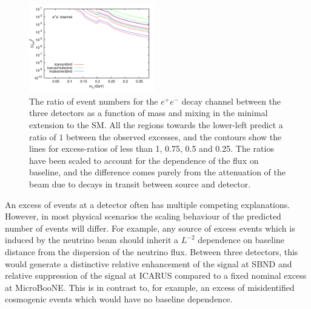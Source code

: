\documentclass[11pt, a4paper]{article}
\def\muboone{MicroBooNE}
\begin{document}
\begin{figure}[t]
%
\centering
%
\includegraphics[width=0.49\textwidth,clip,trim=0 20 35 10]{figures/baselineratios_ee_um4.pdf} 
%
\caption{\label{fig:baselineratios} The ratio of event numbers for the $e^+e^-$
decay channel between the three detectors as a function of mass and mixing in
the minimal extension to the SM.  All the regions towards the lower-left
predict a ratio of $1$ between the observed excesses, and the contours show the
lines for excess-ratios of less than 1, 0.75, 0.5 and 0.25. The ratios have been scaled
to account for the dependence of the flux on baseline, and the difference comes
purely from the attenuation of the beam due to decays in transit between source
and detector. }
%
\end{figure}

An excess of events at a detector often has multiple competing explanations.
However, in most physical scenarios the scaling behaviour of the predicted
number of events will differ. For example, any source of excess events which is
induced by the neutrino beam should inherit a $L^{-2}$ dependence on baseline
distance from the dispersion of the neutrino flux. Between three detectors,
this would generate a distinctive relative enhancement of the signal at SBND
and relative suppression of the signal at ICARUS compared to a fixed nominal
excess at \muboone. This is in contrast to, for example, an excess of
misidentified cosmogenic events which would have no baseline dependence.
\end{document}
